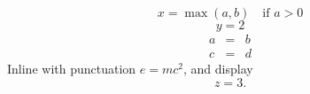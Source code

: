 
\begin{equation}
x = \operatorname{max}(a, b) \quad \text{if } a > 0 \tag{$\star$}
\end{equation}
\begin{equation*}
y = 2 \tag*{(5.1)}
\end{equation*}
\begin{eqnarray}
a &=& b \\
c &=& d \nonumber
\end{eqnarray}
Inline with punctuation $e = mc^2$, and display
$$ z = 3. $$

